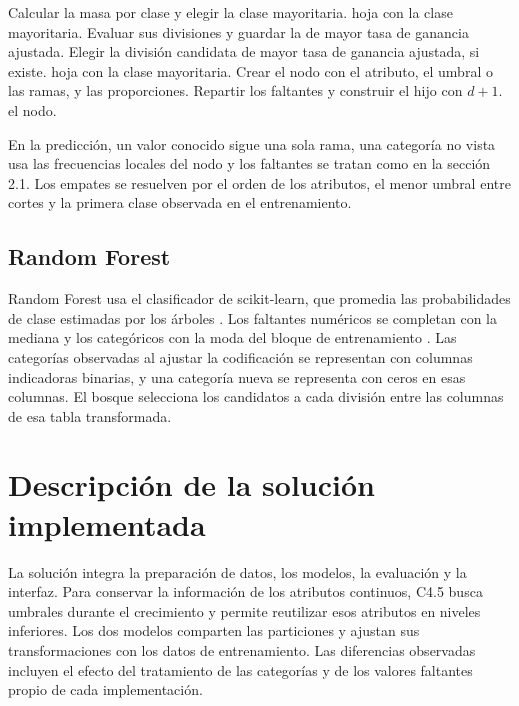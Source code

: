 \documentclass[runningheads]{llncs}
\begin{document}
\begin{algorithm}[!htbp]
\caption{Construcción recursiva de un árbol C4.5}
\label{alg:c45}
\begin{algorithmic}[1]
\STATE Calcular la masa por clase y elegir la clase mayoritaria.
    \RETURN hoja con la clase mayoritaria.
\ENDIF
{}
    \STATE Evaluar sus divisiones y guardar la de mayor tasa de ganancia ajustada.
\ENDFOR
\STATE Elegir la división candidata de mayor tasa de ganancia ajustada, si existe.
    \RETURN hoja con la clase mayoritaria.
\ENDIF
\STATE Crear el nodo con el atributo, el umbral o las ramas, y las proporciones.
    \STATE Repartir los faltantes y construir el hijo con $d+1$.
\ENDFOR
\RETURN el nodo.
\end{algorithmic}
\end{algorithm}

En la predicción, un valor conocido sigue una sola rama, una categoría no vista usa las frecuencias locales del nodo y los faltantes se tratan como en la sección 2.1. Los empates se resuelven por el orden de los atributos, el menor umbral entre cortes y la primera clase observada en el entrenamiento.

\subsection{Random Forest}

Random Forest usa el clasificador de scikit-learn, que promedia las probabilidades de clase estimadas por los árboles \cite{scikitRF}. Los faltantes numéricos se completan con la mediana y los categóricos con la moda del bloque de entrenamiento \cite{scikitImpute}. Las categorías observadas al ajustar la codificación se representan con columnas indicadoras binarias, y una categoría nueva se representa con ceros en esas columnas. El bosque selecciona los candidatos a cada división entre las columnas de esa tabla transformada.

\section{Descripción de la solución implementada}

La solución integra la preparación de datos, los modelos, la evaluación y la interfaz. Para conservar la información de los atributos continuos, C4.5 busca umbrales durante el crecimiento y permite reutilizar esos atributos en niveles inferiores. Los dos modelos comparten las particiones y ajustan sus transformaciones con los datos de entrenamiento. Las diferencias observadas incluyen el efecto del tratamiento de las categorías y de los valores faltantes propio de cada implementación.
\end{document}
